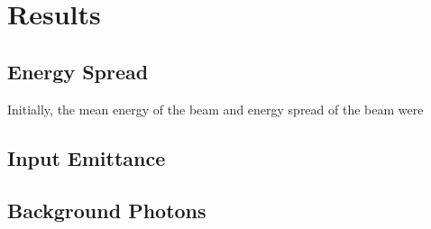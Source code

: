 
\section{Results}
\label{sec:results}


\subsection{Energy Spread}

Initially, the mean energy of the beam and energy spread of the beam were

\subsection{Input Emittance}

\subsection{Background Photons}
